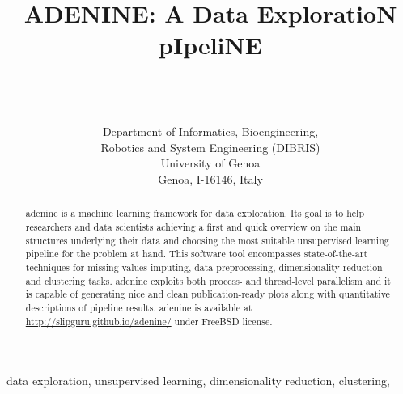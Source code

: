 \documentclass[twoside,11pt]{article}
\makeatletter
\newcommand{\ade}{{\sc adenine}\@\xspace}
\makeatother
\begin{document}
\title{{\sc ADENINE: A Data ExploratioN pIpeliNE}}

\author{ \\
 \\
 \\[1em]
\addr Department of Informatics, Bioengineering, \\Robotics and System Engineering (DIBRIS)\\
     University of Genoa\\
     Genoa, I-16146, Italy}



\maketitle

\begin{abstract}%
\ade is a machine learning framework for data exploration.
Its goal is to help researchers and data scientists achieving a first and quick overview on the main structures underlying their data and choosing the most suitable unsupervised learning pipeline for the problem at hand.
This software tool encompasses state-of-the-art techniques for missing values imputing, data preprocessing, dimensionality reduction and clustering tasks.
\ade exploits both process- and thread-level parallelism and it is capable of generating nice and clean publication-ready plots along with quantitative descriptions of pipeline results. \ade is available at \mbox{\url{http://slipguru.github.io/adenine/}} under FreeBSD license.

\end{abstract}

\begin{keywords}
data exploration, unsupervised learning, dimensionality reduction, clustering, %
\end{keywords}
\end{document}
